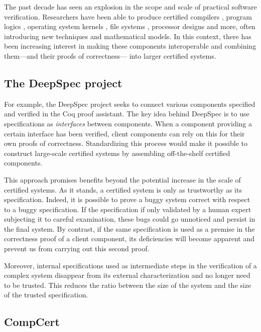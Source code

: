 \documentclass[11pt,oneside,draft]{book}
\theoremstyle{definition}
\begin{document}
The past decade has seen an explosion
in the scope and scale of practical software verification.
Researchers have been able to produce certified
compilers \citep{compcert},
program logics \citep{vst},
operating system kernels \citep{sel4,popl15},
file systems \citep{fscq},
processor designs \citep{safe,kami} and
more,
often introducing new techniques
and mathematical models.
In this context,
there has been increasing interest in
making these components
interoperable and
combining them---and their proofs of correctness---%
into larger certified systems.


\subsection{The DeepSpec project} %

For example, the DeepSpec project \citep{deepspec}
seeks to connect various components
specified and verified in the Coq proof assistant.
The key idea behind DeepSpec
is to use specifications as \emph{interfaces}
between components.
When a component providing a certain interface
has been verified,
client components can rely on this
for their own proofs of correctness.
Standardizing this process would make it possible
to construct large-scale certified systems
by assembling off-the-shelf certified components.

This approach promises benefits
beyond the potential increase in the scale of
certified systems.
As it stands,
a certified system is only
as trustworthy as its specification.
Indeed,
it is possible to prove a buggy system correct
with respect to a buggy specification.
If the specification if only validated by
a human expert subjecting it to careful examination,
these bugs could go unnoticed
and persist in the final system.
By contrast,
if the same specification is used as a premise
in the correctness proof of a client component,
its deficiencies will become apparent
and prevent us from carrying out this second proof.

Moreover,
internal specifications used
as intermediate steps
in the verification of a complex system
disappear from its external characterization
and no longer need to be trusted.
This reduces the ratio between the size of the system
and the size of the trusted specification.


\subsection{CompCert} %
\end{document}
